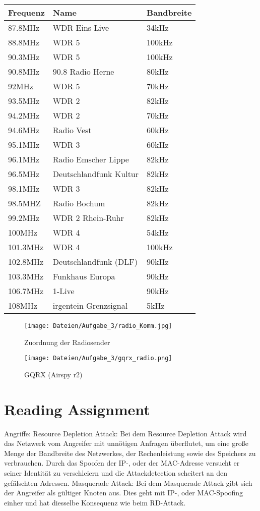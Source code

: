 \documentclass[12pt,a4paper]{article}
\begin{document}
\begin{table}[H]
\centering
\begin{tabular}{|l|l|l|}
\hline
Frequenz & Name & Bandbreite \\
\hline
87.8MHz & 	WDR Eins Live & 34kHz \\
\hline
88.8MHz & WDR 5 & 100kHz\\
\hline
90.3MHz & WDR 5 & 100kHz\\
\hline
90.8MHz & 90.8 Radio Herne & 80kHz \\
\hline
92MHz & WDR 5 & 70kHz\\
\hline
93.5MHz & WDR 2 & 82kHz \\
\hline
94.2MHz & WDR 2 & 70kHz\\
\hline 
94.6MHz & Radio Vest & 60kHz\\
\hline
95.1MHz & WDR 3 & 60kHz \\
\hline
96.1MHz & Radio Emscher Lippe & 82kHz\\
\hline
96.5MHz & Deutschlandfunk Kultur & 82kHz\\
\hline
98.1MHz & WDR 3 & 82kHz\\
\hline
98.5MHZ & Radio Bochum & 82kHz \\
\hline
99.2MHz & WDR 2 Rhein-Ruhr &82kHz\\
\hline
100MHz & WDR 4 & 54kHz \\
\hline
101.3MHz & WDR 4 & 100kHz \\
\hline
102.8MHz & Deutschlandfunk (DLF)&90kHz\\
\hline
103.3MHz & Funkhaus Europa & 90kHz\\
\hline
106.7MHz & 1-Live & 90kHz\\
\hline
108MHz & irgentein Grenzsignal & 5kHz\\
\hline
\end{tabular}
\end{table}
\begin{figure}[H]
\centering
\texttt{[image: Dateien/Aufgabe\_3/radio\_Komm.jpg]} 
\caption{Zuordnung der Radiosender}
\label{fig:3_3}
\end{figure}
\begin{figure}[H]
\centering
\texttt{[image: Dateien/Aufgabe\_3/gqrx\_radio.png]} 
\caption{GQRX (Airspy r2)}
\label{fig:3_4}
\end{figure}
\section{Reading Assignment}
Angriffe:
	Resource Depletion Attack: 
		Bei dem Resource Depletion Attack wird das Netzwerk vom Angreifer mit unnötigen Anfragen überflutet, um eine große Menge der Bandbreite des Netzwerkes, der Rechenleistung sowie des Speichers zu verbrauchen. Durch das Spoofen der IP-, oder der MAC-Adresse versucht er seiner Identität zu verschleiern und die Attackdetection scheitert an den gefälschten Adressen.
	Masquerade Attack:
		Bei dem Masquerade Attack gibt sich der Angreifer als gültiger Knoten aus. Dies geht mit IP-, oder MAC-Spoofing einher und hat diesselbe Konsequenz wie beim RD-Attack.
\end{document}
